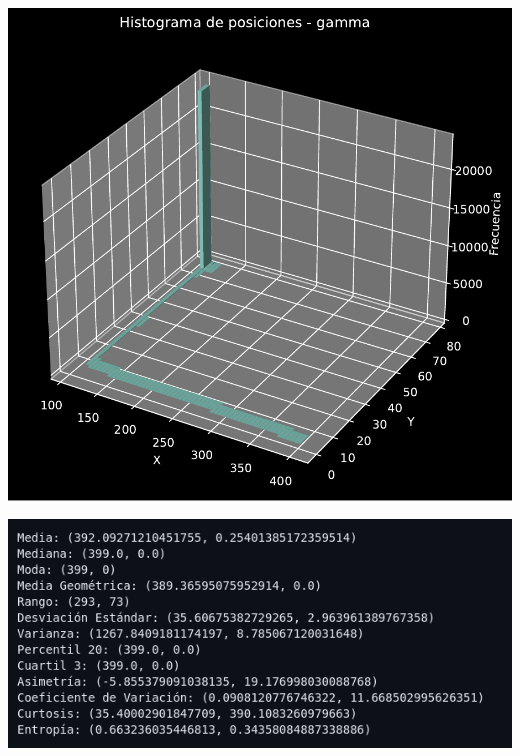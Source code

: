 \documentclass[11pt]{article} %
\begin{document}
	\begin{multicols}{2}
		\begin{minipage}{\linewidth}
			\centering
			\includegraphics[width=0.8\linewidth]{hist_posiciones_gamma.pdf}
			\label{fig:posGammaHist}
		\end{minipage}
		\vfill\columnbreak
		\begin{minipage}{\linewidth}
			\centering
			\includegraphics[width=1\linewidth]{g3.png}%
			\label{posGammaMet}
		\end{minipage}
	\end{multicols}
	
\end{document}
